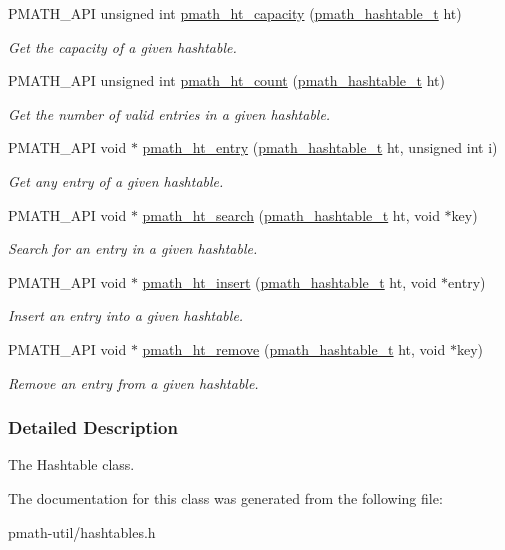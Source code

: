 \begin{CompactItemize}
PMATH\_\-API unsigned int \hyperlink{group__hashtables_gc3bb123d747694b6144b8561efb15feb}{pmath\_\-ht\_\-capacity} (\hyperlink{classpmath__hashtable__t}{pmath\_\-hashtable\_\-t} ht)
\begin{CompactList}\small\item\em Get the capacity of a given hashtable. \item\end{CompactList}\item 
PMATH\_\-API unsigned int \hyperlink{group__hashtables_gf42cb622735f861185f056de654d3632}{pmath\_\-ht\_\-count} (\hyperlink{classpmath__hashtable__t}{pmath\_\-hashtable\_\-t} ht)
\begin{CompactList}\small\item\em Get the number of valid entries in a given hashtable. \item\end{CompactList}\item 
PMATH\_\-API void $\ast$ \hyperlink{group__hashtables_gd3f57058604e14d27b61a0282c02be87}{pmath\_\-ht\_\-entry} (\hyperlink{classpmath__hashtable__t}{pmath\_\-hashtable\_\-t} ht, unsigned int i)
\begin{CompactList}\small\item\em Get any entry of a given hashtable. \item\end{CompactList}\item 
PMATH\_\-API void $\ast$ \hyperlink{group__hashtables_g94ad66bd7413d8237fa3f58ef8e944a1}{pmath\_\-ht\_\-search} (\hyperlink{classpmath__hashtable__t}{pmath\_\-hashtable\_\-t} ht, void $\ast$key)
\begin{CompactList}\small\item\em Search for an entry in a given hashtable. \item\end{CompactList}\item 
PMATH\_\-API void $\ast$ \hyperlink{group__hashtables_ged2c72c01c0c883154d77ddb6f42dd05}{pmath\_\-ht\_\-insert} (\hyperlink{classpmath__hashtable__t}{pmath\_\-hashtable\_\-t} ht, void $\ast$entry)
\begin{CompactList}\small\item\em Insert an entry into a given hashtable. \item\end{CompactList}\item 
PMATH\_\-API void $\ast$ \hyperlink{group__hashtables_gc0825f215931052b62d62abd574e0047}{pmath\_\-ht\_\-remove} (\hyperlink{classpmath__hashtable__t}{pmath\_\-hashtable\_\-t} ht, void $\ast$key)
\begin{CompactList}\small\item\em Remove an entry from a given hashtable. \item\end{CompactList}\end{CompactItemize}


\subsubsection{Detailed Description}
The Hashtable class. 

The documentation for this class was generated from the following file:\begin{CompactItemize}
\item 
pmath-util/hashtables.h\end{CompactItemize}
